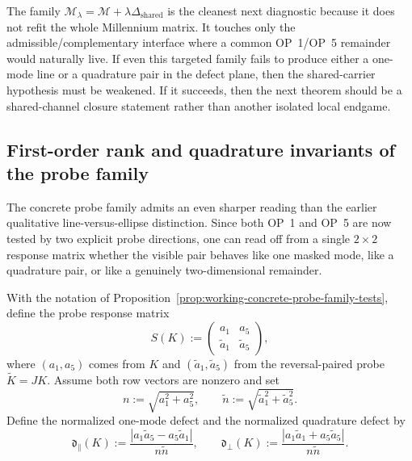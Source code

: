 \begin{remark}
\label{rem:working-why-probe-family-next}
The family \(\mathcal M_\lambda=\mathcal M+\lambda\Delta_{\mathrm{shared}}\) is the cleanest next diagnostic because it does not refit the whole Millennium matrix. It touches only the admissible/complementary interface where a common OP~1/OP~5 remainder would naturally live. If even this targeted family fails to produce either a one-mode line or a quadrature pair in the defect plane, then the shared-carrier hypothesis must be weakened. If it succeeds, then the next theorem should be a shared-channel closure statement rather than another isolated local endgame.
\end{remark}

\subsection*{First-order rank and quadrature invariants of the probe family}
The concrete probe family admits an even sharper reading than the earlier qualitative line-versus-ellipse distinction. Since both OP~1 and OP~5 are now tested by two explicit probe directions, one can read off from a single $2\times2$ response matrix whether the visible pair behaves like one masked mode, like a quadrature pair, or like a genuinely two-dimensional remainder.

\begin{definition}
\label{def:working-probe-response-matrix}
With the notation of Proposition~\ref{prop:working-concrete-probe-family-tests}, define the probe response matrix
\[
  S(K):=
  \begin{pmatrix}
    a_1 & a_5\\
    \tilde a_1 & \tilde a_5
  \end{pmatrix},
\]
where $(a_1,a_5)$ comes from $K$ and $(\tilde a_1,\tilde a_5)$ from the reversal-paired probe $\widetilde K=JK$.
Assume both row vectors are nonzero and set
\[
  n:=\sqrt{a_1^2+a_5^2},
  \qquad
  \tilde n:=\sqrt{\tilde a_1^2+\tilde a_5^2}.
\]
Define the normalized one-mode defect and the normalized quadrature defect by
\[
  \mathfrak d_{\parallel}(K)
  :=
  \frac{|a_1\tilde a_5-a_5\tilde a_1|}{n\tilde n},
  \qquad
  \mathfrak d_{\perp}(K)
  :=
  \frac{|a_1\tilde a_1+a_5\tilde a_5|}{n\tilde n}.
\]
\end{definition}

